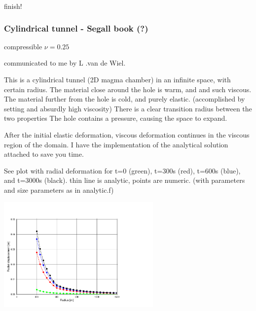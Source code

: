 {\color{red} finish!}










\subsubsection{Cylindrical tunnel - Segall book (?)}

{\color{orange} compressible $\nu=0.25$}

communicated to me by L .van de Wiel.

This is a cylindrical tunnel (2D magma chamber) in an infinite space, with certain radius.
The material close around the hole is warm, and and such viscous. The material further from the hole is cold, and purely elastic. (accomplished by setting and absurdly high viscosity) 
There is a clear transition radius between the two properties
The hole contains a pressure, causing the space to expand.

After the initial elastic deformation, viscous deformation continues in the viscous region of the domain.
I have the implementation of the analytical solution attached to save you time.

See plot with radial deformation for t=0 (green), t=300s (red), t=600s (blue), and t=3000s (black).
thin line is analytic, points are numeric.
(with parameters and size parameters as in analytic.f)


\begin{center}
\includegraphics[width=8cm]{images/viscoelasticity/radialDisp}
\end{center}










